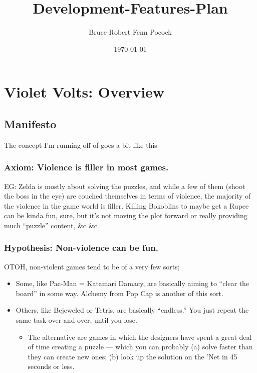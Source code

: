 \documentclass[11pt]{article}
\author{Bruce-Robert Fenn Pocock}
\date{\today}
\title{Development-Features-Plan}
\begin{document}
\maketitle
\tableofcontents

\section{Violet Volts: Overview}
\label{sec-1}
\subsection{Manifesto}
\label{sec-1-1}

The concept I'm running off of goes a bit like this

\subsubsection{Axiom: Violence is filler in most games.}
\label{sec-1-1-1}

EG: Zelda is mostly about solving the puzzles, and while a few of them
(shoot  the boss  in  the  eye) are  couched  themselves  in terms  of
violence,  the  majority  of  the   violence  in  the  game  world  is
filler. Killing Bokoblins to maybe get a Rupee can be kinda fun, sure,
but it's not moving the plot forward or really providing much “puzzle”
content, \&c \&c.
\subsubsection{Hypothesis: Non-violence can be fun.}
\label{sec-1-1-2}

OTOH, non-violent games tend to be of a very few sorts;

\begin{itemize}
\item Some, like Pac-Man = Katamari Damacy, are basically aiming to
“clear the board” in some way. Alchemy from Pop Cap is another of
this sort.

\item Others, like Bejeweled or Tetris, are basically “endless.” You just
repeat the same task over and over, until you lose.

\begin{itemize}
\item The alternative are games in which the designers have spent a great
deal of time creating a puzzle — which you can probably (a) solve
faster than they can create new ones; (b) look up the solution on
the 'Net in 45 seconds or less.
\end{itemize}
\end{itemize}
\end{document}
